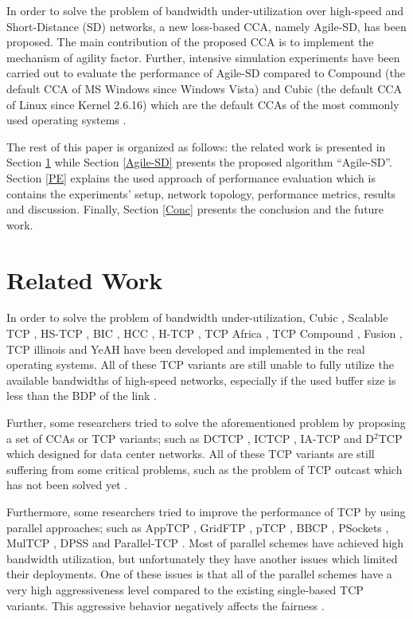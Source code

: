 \documentclass[preprint,3p,times,twocolumn,authoryear]{elsarticle}
\begin{document}
In order to solve the problem of bandwidth under-utilization over high-speed and Short-Distance (SD) networks, a new loss-based CCA, namely Agile-SD, has been proposed. The main contribution of the proposed CCA is to implement the mechanism of agility factor. Further, intensive simulation experiments have been carried out to evaluate the performance of Agile-SD compared to Compound (the default CCA of MS Windows since Windows Vista) and Cubic (the default CCA of Linux since Kernel 2.6.16) which are the default CCAs of the most commonly used operating systems \citep{Afanasyev2010, alrshah2014}.

The rest of this paper is organized as follows: the related work is presented in Section \ref{RW} while Section \ref{Agile-SD} presents the proposed algorithm \textquotedblleft Agile-SD\textquotedblright. Section \ref{PE} explains the used approach of performance evaluation which is contains the experiments' setup, network topology, performance metrics, results and discussion. Finally, Section \ref{Conc} presents the conclusion and the future work.

\section{Related Work}
\label{RW}

In order to solve the problem of bandwidth under-utilization, Cubic \citep{Ha2008}, Scalable TCP \citep{Kelly2003}, HS-TCP \citep{Floyd2003}, BIC \citep{xu2004}, HCC \citep{xu2011}, H-TCP \citep{Leith2004}, TCP Africa \citep{King2005}, TCP Compound \citep{Tan2006}, Fusion \citep{Kaneko2007}, TCP illinois \citep{Liu2008} and YeAH \citep{Baiocchi2007} have been developed and implemented in the real operating systems. All of these TCP variants are still unable to fully utilize the available bandwidths of high-speed networks, especially if the used buffer size is less than the BDP of the link \citep{Afanasyev2010, Scharf2011, Callegari2012b, Callegari2014, Lar2013, acharya2012, alrshah2014}. 

Further, some researchers tried to solve the aforementioned problem by proposing a set of CCAs or TCP variants; such as DCTCP \citep{Alizadeh2010}, ICTCP \citep{Haitao2013}, IA-TCP \citep{Jaehyun2012} and D$^2$TCP \citep{Vamanan2012} which designed for data center networks. All of these TCP variants are still suffering from some critical problems, such as the problem of TCP outcast which has not been solved yet \citep{Tahiliani2012}.

Furthermore, some researchers tried to improve the performance of TCP by using parallel approaches; such as AppTCP \citep{Wang2013}, GridFTP \citep{allcock2005}, pTCP \citep{hsieh2002}, BBCP \citep{hanushevsky2001}, PSockets \citep{sivakumar2000}, MulTCP \citep{crowcroft1998}, DPSS \citep{Tierney1994} and Parallel-TCP \citep{alrshah2009, alrshah2013}. Most of parallel schemes have achieved high bandwidth utilization, but unfortunately they have another issues which limited their deployments. One of these issues is that all of the parallel schemes have a very high aggressiveness level compared to the existing single-based TCP variants. This aggressive behavior negatively affects the fairness \citep{Fu2005, fu2007}.
\end{document}
